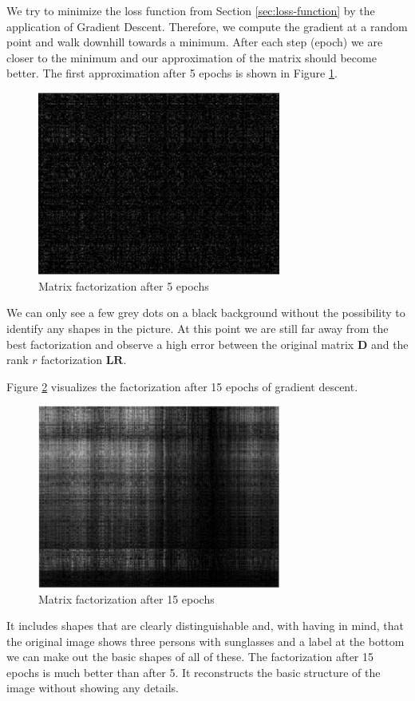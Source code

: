 \documentclass{support/acm_proc_article-sp}
\begin{document}
    We try to minimize the loss function from Section \ref{sec:loss-function} by the application of Gradient Descent.
    Therefore, we compute the gradient at a random point and walk downhill towards a minimum.
    After each step (epoch) we are closer to the minimum and our approximation of the matrix should become better.
    The first approximation after 5 epochs is shown in Figure \ref{fig:gradient-5}.
    \begin{figure}[htbp]
        \centering
        \includegraphics[width=8cm]{images/gradient-5.png}
        \caption{Matrix factorization after 5 epochs}
        \label{fig:gradient-5}
    \end{figure}
    We can only see a few grey dots on a black background without the possibility to identify any shapes in the picture.
    At this point we are still far away from the best factorization and observe a high error between the
    original matrix $\mathbf{D}$ and the rank $r$ factorization $\mathbf{LR}$.

    Figure \ref{fig:gradient-15} visualizes the factorization after 15 epochs of gradient descent.
    \begin{figure}[htbp]
        \centering
        \includegraphics[width=8cm]{images/gradient-15.png}
        \caption{Matrix factorization after 15 epochs}
        \label{fig:gradient-15}
    \end{figure}
    It includes shapes that are clearly distinguishable and, with having in mind, that the original image shows three persons
    with sunglasses and a label at the bottom we can make out the basic shapes of all of these.
    The factorization after 15 epochs is much better than after 5.
    It reconstructs the basic structure of the image without showing any details.
\end{document}
